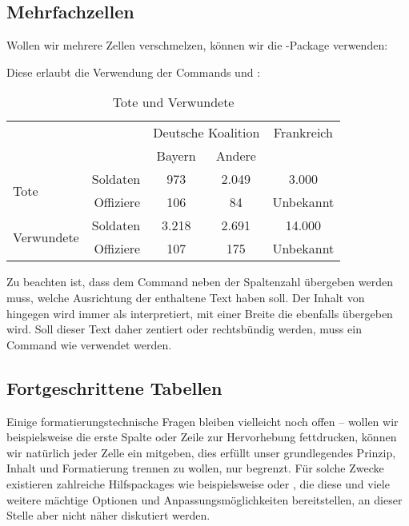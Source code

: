 \subsection{Mehrfachzellen}
Wollen wir mehrere Zellen verschmelzen, können wir die -Package verwenden:
\begin{latexlisting}
	\usepackage{multirow}
\end{latexlisting}
Diese erlaubt die Verwendung der Commands  und :
\begin{latexlisting}
	\begin{table}
		\begin{tabular}{l r c c c}
			\toprule
			& & \multicolumn{2}{c}{Deutsche Koalition} & Frankreich \tabularnewline  \cmidrule{3-4}
			& & Bayern & Andere & \tabularnewline \midrule
			\multirow{2}{2cm}{Tote} & Soldaten & 973 & 2.049 & 3.000 \tabularnewline 
			& Offiziere & 106 & 84 & Unbekannt \tabularnewline 
			\multirow{2}{2cm}{Verwundete} & Soldaten & 3.218 & 2.691 & 14.000 \tabularnewline 
			& Offiziere & 107 & 175 & Unbekannt \tabularnewline 
			\bottomrule
		\end{tabular}
		\caption{Tote und Verwundete}
		\label{tab:verlust-sedanschlacht}
	\end{table}
\end{latexlisting}
Zu beachten ist, dass dem Command  neben der Spaltenzahl übergeben werden muss, welche Ausrichtung der enthaltene Text haben soll.
Der Inhalt von  hingegen wird immer als  interpretiert, mit einer Breite die ebenfalls übergeben wird.
Soll dieser Text daher zentiert oder rechtsbündig werden, muss ein Command wie  verwendet werden.

\subsection{Fortgeschrittene Tabellen}
Einige formatierungstechnische Fragen bleiben vielleicht noch offen -- wollen wir beispielsweise die erste Spalte oder Zeile zur Hervorhebung fettdrucken, können wir natürlich jeder Zelle ein  mitgeben, dies erfüllt unser grundlegendes Prinzip, Inhalt und Formatierung trennen zu wollen, nur begrenzt.
Für solche Zwecke existieren zahlreiche Hilfspackages wie beispielsweise  oder , die diese und viele weitere mächtige Optionen und Anpassungsmöglichkeiten bereitstellen, an dieser Stelle aber nicht näher diskutiert werden.

